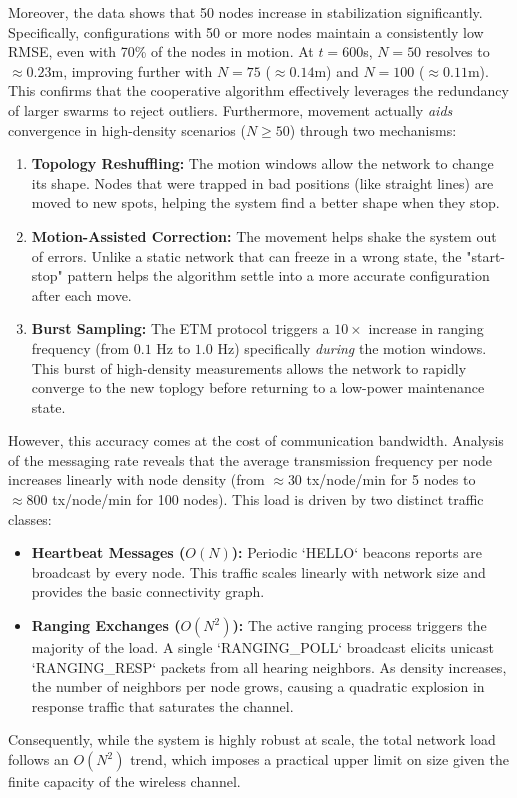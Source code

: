 Moreover, the data shows that 50 nodes increase in stabilization significantly. Specifically, configurations with 50 or more nodes maintain a consistently low RMSE, even with 70\% of the nodes in motion. At $t=600$s, $N=50$ resolves to $\approx 0.23$m, improving further with $N=75$ ($\approx 0.14$m) and $N=100$ ($\approx 0.11$m). 
This confirms that the cooperative algorithm effectively leverages the redundancy of larger swarms to reject outliers. Furthermore, movement actually \textit{aids} convergence in high-density scenarios ($N \ge 50$) through two mechanisms:
\begin{enumerate}
  \item \textbf{Topology Reshuffling:} The motion windows allow the network to change its shape. Nodes that were trapped in bad positions (like straight lines) are moved to new spots, helping the system find a better shape when they stop.
    \item \textbf{Motion-Assisted Correction:} The movement helps shake the system out of errors. Unlike a static network that can freeze in a wrong state, the "start-stop" pattern helps the algorithm settle into a more accurate configuration after each move.
    \item \textbf{Burst Sampling:} The ETM protocol triggers a $10\times$ increase in ranging frequency (from $0.1$ Hz to $1.0$ Hz) specifically \textit{during} the motion windows. This burst of high-density measurements allows the network to rapidly converge to the new toplogy before returning to a low-power maintenance state.
\end{enumerate}

\noindent However, this accuracy comes at the cost of communication bandwidth. Analysis of the messaging rate reveals that the average transmission frequency per node increases linearly with node density (from $\approx 30$ tx/node/min for 5 nodes to $\approx 800$ tx/node/min for 100 nodes). This load is driven by two distinct traffic classes:
\begin{itemize}
    \item \textbf{Heartbeat Messages ($O(N)$):} Periodic `HELLO` beacons reports are broadcast by every node. This traffic scales linearly with network size and provides the basic connectivity graph.
    \item \textbf{Ranging Exchanges ($O(N^2)$):} The active ranging process triggers the majority of the load. A single `RANGING\_POLL` broadcast elicits unicast `RANGING\_RESP` packets from all hearing neighbors. As density increases, the number of neighbors per node grows, causing a quadratic explosion in response traffic that saturates the channel.
\end{itemize}
Consequently, while the system is highly robust at scale, the total network load follows an $O(N^2)$ trend, which imposes a practical upper limit on size given the finite capacity of the wireless channel.
